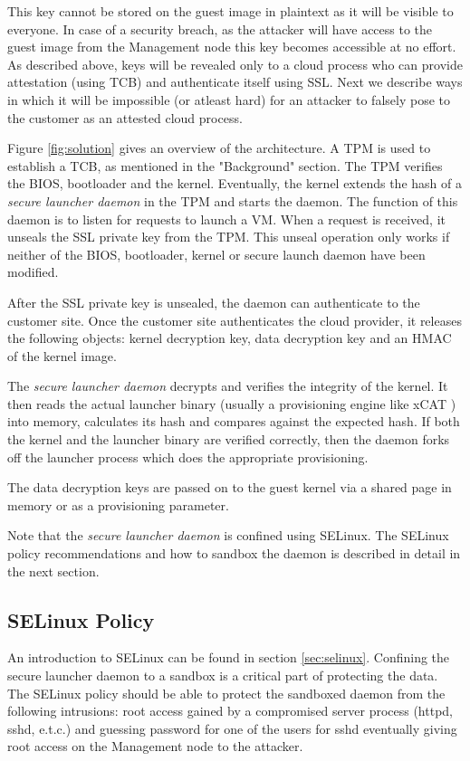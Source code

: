 \documentclass[10pt,twocolumn,pdftex]{article}
\begin{document}
This key cannot be stored on the guest image in plaintext as it will be visible to everyone. In case of a security breach, as the attacker will have access to the guest image from the Management node this key becomes accessible at no effort.  As described above, keys will be revealed only to a cloud process who can provide attestation (using TCB) and authenticate itself using SSL. Next we describe ways in which it will be impossible (or atleast hard) for an attacker to falsely pose to the customer as an attested cloud process.

Figure \ref{fig:solution} gives an overview of the architecture.
A TPM is used to establish a TCB, as mentioned in the "Background" section. The TPM verifies the BIOS, bootloader and the kernel. Eventually, the kernel extends the hash of a \emph{secure launcher daemon} in the TPM and starts the daemon. The function of this daemon is to listen for requests to launch a VM. When a request is received, it unseals the SSL private key from the TPM. This unseal operation only works if neither of the BIOS, bootloader, kernel or secure launch daemon have been modified.

After the SSL private key is unsealed, the daemon can authenticate to the customer site. Once the customer site authenticates the cloud provider, it releases the following objects: kernel decryption key, data decryption key and an HMAC of the kernel image.

The \emph{secure launcher daemon} decrypts and verifies the integrity of the kernel. It then reads the actual launcher binary (usually a provisioning engine like xCAT \cite{xCAT}) into memory, calculates its hash and compares against the expected hash. If both the kernel and the launcher binary are verified correctly, then the daemon forks off the launcher process which does the appropriate provisioning.

The data decryption keys are passed on to the guest kernel via a shared page in memory or as a provisioning parameter.

Note that the \emph{secure launcher daemon} is confined using SELinux. The SELinux policy recommendations and how to sandbox the daemon is described in detail in the next section.

\subsection{SELinux Policy}
An introduction to SELinux can be found in section \ref{sec:selinux}. Confining the secure launcher daemon to a sandbox is a critical part of protecting the data. The SELinux policy should be able to protect the sandboxed daemon from the following intrusions: root access gained by a compromised server process (httpd, sshd, e.t.c.) and guessing password  for one of the users for sshd eventually giving root access on the Management node to the attacker. 
\end{document}
